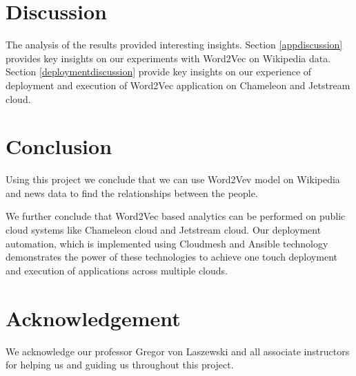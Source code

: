\documentclass[9pt,twocolumn,twoside]{../../styles/osajnl}
\begin{document}


\section{Discussion}
The analysis of the results provided interesting insights.
Section \ref{appdiscussion} provides key insights on our experiments with
Word2Vec on Wikipedia data. Section \ref{deploymentdiscussion} provide key
insights on our experience of deployment and execution of Word2Vec
application on Chameleon and Jetstream cloud.
 \label{appdiscussion}
 \label{deploymentdiscussion}

\section{Conclusion}

Using this project we conclude that we can use Word2Vev model on Wikipedia
and news data to find the relationships between the people.

We further conclude that Word2Vec based analytics can be performed on public
cloud systems like Chameleon cloud and Jetstream cloud. Our deployment
automation, which is implemented using Cloudmesh and Ansible technology
demonstrates the power of these technologies to achieve one touch deployment
and execution of applications across multiple clouds.

\section{Acknowledgement}

We acknowledge our professor Gregor von Laszewski and all associate instructors for helping us and guiding us throughout this project.
\end{document}
